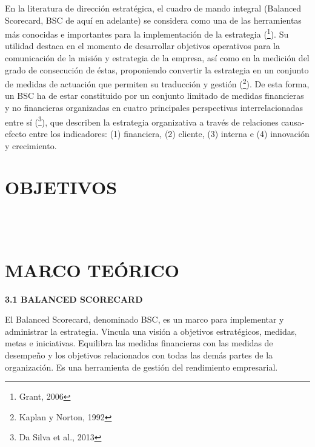 \documentclass[a4paper,12pt,twocolumn]{article}
\begin{document}
\item{En la literatura de dirección estratégica, el cuadro de mando integral (Balanced Scorecard, BSC de aquí en adelante) se considera como una de las herramientas más conocidas e importantes para la implementación de la estrategia (\footnote{Grant, 2006}). Su utilidad destaca en el momento de desarrollar objetivos operativos para la comunicación de la misión y estrategia de la empresa, así como en la medición del grado de consecución de éstas, proponiendo convertir la estrategia en un conjunto de medidas de actuación que permiten su traducción y gestión (\footnote{Kaplan y Norton, 1992}). De esta forma, un BSC ha de estar constituido por un conjunto limitado de medidas financieras y no financieras organizadas en cuatro principales perspectivas interrelacionadas entre sí (\footnote{Da Silva et al., 2013}), que describen la estrategia organizativa a través de relaciones causa-efecto entre los indicadores: (1) financiera, (2) cliente, (3) interna e (4) innovación y crecimiento.}

\section{OBJETIVOS} 
\\
\textbf{}
\\

\section{MARCO TEÓRICO}
\textbf{3.1 BALANCED SCORECARD}
\item{El Balanced Scorecard, denominado BSC, es un marco para implementar y administrar la estrategia. Vincula una visión a objetivos estratégicos, medidas, metas e iniciativas. Equilibra las medidas financieras con las medidas de desempeño y los objetivos relacionados con todas las demás partes de la organización. Es una herramienta de gestión del rendimiento empresarial.}
\end{document}
